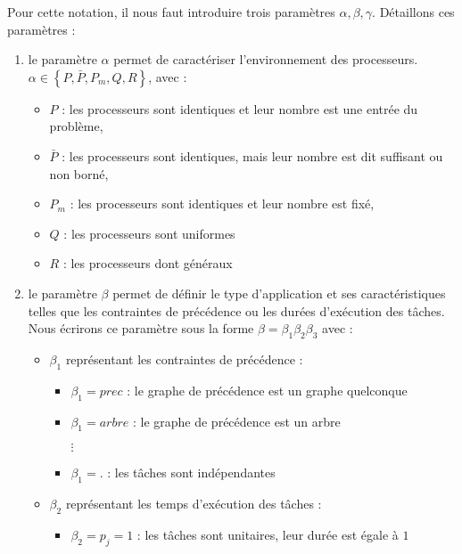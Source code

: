 \documentclass[a4paper,9pt]{report}
\begin{document}
Pour cette notation, il nous faut introduire trois paramètres $\alpha, \beta, \gamma$. Détaillons
ces paramètres :
\begin{enumerate}
    \item le paramètre $\alpha$ permet de caractériser l'environnement des processeurs. \\
        $\alpha \in \left\{ P, \bar{P}, P_m, Q, R \right\}$, avec :
        \begin{itemize}
            \item $P$ : les processeurs sont identiques et leur nombre est une entrée du problème,
            \item $\bar{P}$ : les processeurs sont identiques, mais leur nombre est dit suffisant ou
                non borné,
            \item $P_m$ : les processeurs sont identiques et leur nombre est fixé,
            \item $Q$ : les processeurs sont uniformes
            \item $R$ : les processeurs dont généraux
        \end{itemize}
    \item le paramètre $\beta$ permet de définir le type d'application et ses caractéristiques
        telles que les contraintes de précédence ou les durées d'exécution des tâches. Nous écrirons
        ce paramètre sous la forme $\beta = \beta_1\beta_2\beta_3$ avec :
        \begin{itemize}[label=$\bullet$]
            \item $\beta_1$ représentant les contraintes de précédence :
                \begin{itemize}
                    \item $\beta_1 = prec$ : le graphe de précédence est un graphe quelconque
                    \item $\beta_1 = arbre$ : le graphe de précédence est un arbre
                    \item[$\vdots$]
                    \item $\beta_1 = .$ : les tâches sont indépendantes
                \end{itemize}
            \item $\beta_2$ représentant les temps d'exécution des tâches :
                \begin{itemize}
                    \item $\beta_2 = p_j = 1$ : les tâches sont unitaires, leur durée est égale à
                        $1$

\end{itemize}
\end{itemize}
\end{enumerate}
\end{document}
